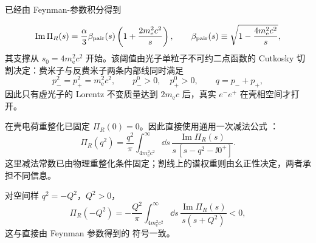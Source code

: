 \begin{derivation}
已经由 Feynman-参数积分得到

\begin{equation*}
 \operatorname{Im}\Pi_R(s)
 =\frac{\alpha}{3}
 \beta_{\rm pair}(s)\left(1+\frac{2m_{\mathrm e}^2c^2}{s}\right),
 \qquad
 \beta_{\rm pair}(s)\equiv\sqrt{1-\frac{4m_{\mathrm e}^2c^2}{s}},
 \end{equation*}
其支撑从 $s_0=4m_{\mathrm e}^2c^2$ 开始。该阈值由光子单粒子不可约二点函数的 Cutkosky 切割决定：费米子与反费米子两条内部线同时满足
\begin{equation*}
 p_-^2=p_+^2=m_{\mathrm e}^2c^2,
 \qquad
 p_-^0>0,\quad p_+^0>0,
 \qquad
 q=p_-+p_+,
\end{equation*}
因此只有虚光子的 Lorentz 不变质量达到 $2m_{\mathrm e} c$ 后，真实 $e^-e^+$ 在壳相空间才打开。

在壳电荷重整化已固定 $\Pi_R(0)=0$。因此直接使用通用一次减法公式 ：
\begin{equation*}
 {
 \Pi_R(q^2)
 =\frac{q^2}{\pi}
 \int_{4m_{\mathrm e}^2c^2}^{\infty}\dd s\,
 \frac{\operatorname{Im}\Pi_R(s)}
 {s\,[s-q^2-\ii0^+]}.}
 \end{equation*}
这里减法常数已由物理重整化条件固定；割线上的谱权重则由幺正性决定，两者承担不同信息。

对空间样 $q^2=-Q^2$，$Q^2>0$，
\begin{equation*}
 \Pi_R(-Q^2)
 =-\frac{Q^2}{\pi}
 \int_{4m_{\mathrm e}^2c^2}^{\infty}\dd s\,
 \frac{\operatorname{Im}\Pi_R(s)}{s(s+Q^2)}<0,
 \end{equation*}
这与直接由 Feynman 参数得到的  符号一致。
\end{derivation}

